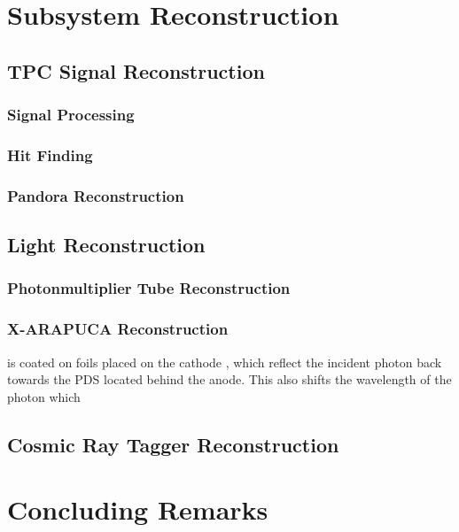 \section{Subsystem Reconstruction}

\subsection{TPC Signal Reconstruction}
\subsubsection{Signal Processing}
\subsubsection{Hit Finding}
\subsubsection{Pandora Reconstruction}

\subsection{Light Reconstruction}
\subsubsection{Photonmultiplier Tube Reconstruction}
\subsubsection{X-ARAPUCA Reconstruction}

is coated on foils placed on the cathode
, which reflect the incident photon back towards the PDS located behind the anode. 
This also shifts the wavelength of the photon which 



\subsection{Cosmic Ray Tagger Reconstruction}

\section{Concluding Remarks}
